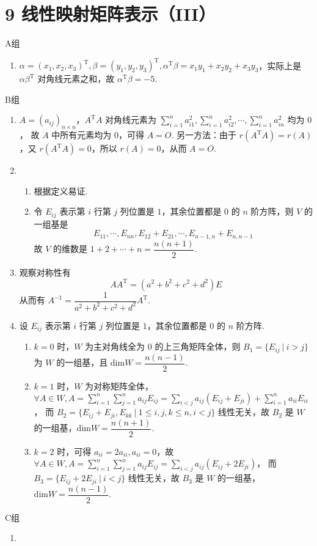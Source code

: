 \section*{9 线性映射矩阵表示（III）}

\vspace{2ex}

\centerline{\heiti A组}
\begin{enumerate}
    \item $\alpha = (x_1,x_2,x_3)^{\mathrm{T}},\beta = (y_1,y_2,y_3)^{\mathrm{T}},\alpha^{\mathrm{T}}\beta=x_1y_1+x_2y_2+x_3y_3$，实际上是 $\alpha\beta^{\mathrm{T}}$ 对角线元素之和，故 $\alpha^{\mathrm{T}}\beta=-5$.
\end{enumerate}

\centerline{\heiti B组}
\begin{enumerate}
    \item $A=(a_{ij})_{n\times n}$，$A^\mathrm{T}A$ 对角线元素为 $\sum\limits_{i=1}^na_{i1}^2,\sum\limits_{i=1}^na_{i2}^2,\cdots,\sum\limits_{i=1}^na_{in}^2$ 均为 $0$，
    故 $A$ 中所有元素均为 $0$，可得 $A=O$.
    另一方法：由于 $r(A^\mathrm{T}A) = r(A)$，又 $r(A^\mathrm{T}A)=0$，所以 $r(A)=0$，从而 $A=O$.
    \item \begin{enumerate}
        \item 根据定义易证.
        \item 令 $E_{ij}$ 表示第 $i$ 行第 $j$ 列位置是 $1$，其余位置都是 $0$ 的 $n$ 阶方阵，则 $V$ 的一组基是
        \[E_{11},\cdots,E_{nn},E_{12}+E_{21},\cdots,E_{n-1,n}+E_{n,n-1}\]
        故 $V$ 的维数是 $1+2+\cdots+n=\dfrac{n(n+1)}{2}$.
        \end{enumerate}
    \item 观察对称性有
    \[AA^{\mathrm{T}}=(a^2+b^2+c^2+d^2)E\]
    从而有 $A^{-1}=\dfrac{1}{a^2+b^2+c^2+d^2}A^{\mathrm{T}}$.
    \item 设 $E_{ij}$ 表示第 $i$ 行第 $j$ 列位置是 $1$，其余位置都是 $0$ 的 $n$ 阶方阵.
        \begin{enumerate}
            \item $k=0$ 时，$W$ 为主对角线全为 $0$ 的上三角矩阵全体，则 $B_1=\{E_{ij}\ |\ i>j\}$ 为 $W$ 的一组基，且 $\mathrm{dim}W=\dfrac{n(n-1)}{2}$.
            \item $k=1$ 时，$W$ 为对称矩阵全体，$\forall A\in W,A = \sum\limits_{i=1}^n\sum\limits_{j=1}^na_{ij}E_{ij}=\sum\limits_{i<j}a_{ij}(E_{ij}+E_{ji})+\sum\limits_{i=1}^na_{ii}E_{ii}$，
            而 $B_2=\{E_{ij}+E_{ji},E_{kk}\ |\ 1\leq i,j,k\leq n,i<j\}$ 线性无关，故 $B_2$ 是 $W$ 的一组基，$\mathrm{dim}W=\dfrac{n(n+1)}{2}$.
            \item $k=2$ 时，可得 $a_{ii}=2a_{ii},a_{ii}=0$，故 $\forall A\in W,A = \sum\limits_{i=1}^n\sum\limits_{j=1}^na_{ij}E_{ij}=\sum\limits_{i<j}a_{ij}(E_{ij}+2E_{ji})$，
            而 $B_3=\{E_{ij}+2E_{ji}\ |\ i<j\}$ 线性无关，故 $B_3$ 是 $W$ 的一组基，$\mathrm{dim}W=\dfrac{n(n-1)}{2}$.
        \end{enumerate}
\end{enumerate}

\centerline{\heiti C组}
\begin{enumerate}
    \item 
\end{enumerate}

\clearpage
